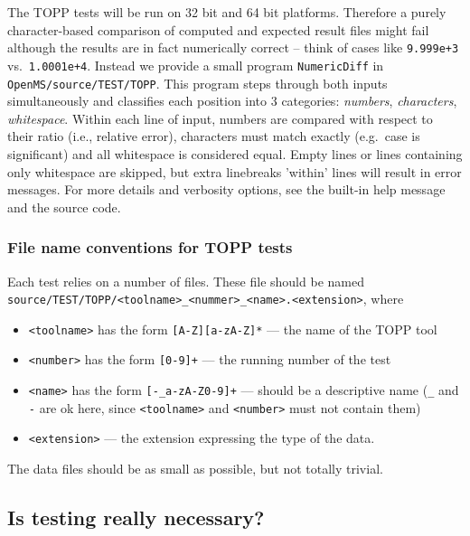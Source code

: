 \documentclass[a4]{article}
\begin{document}
The TOPP tests will be run on 32 bit and 64 bit platforms.  Therefore a purely
character-based comparison of computed and expected result files might fail
although the results are in fact numerically correct -- think of cases like
\texttt{9.999e+3} vs.\ \texttt{1.0001e+4}.  Instead we provide a small program
\texttt{NumericDiff} in \texttt{OpenMS/source/TEST/TOPP}.  This program steps
through both inputs simultaneously and classifies each position into 3
categories: \emph{numbers}, \emph{characters}, \emph{whitespace}.  Within each
line of input, numbers are compared with respect to their ratio (i.e.,
relative error), characters must match exactly (e.g.\ case is significant) and
all whitespace is considered equal.  Empty lines or lines containing only
whitespace are skipped, but extra linebreaks 'within' lines will result in error
messages.  For more details and verbosity options, see the built-in help
message and the source code.

\subsubsection{File name conventions for TOPP tests}

Each test relies on a number of files.  These file should be named \\
\verb|source/TEST/TOPP/<toolname>_<nummer>_<name>.<extension>|, where
\begin{itemize}
 \item \verb|<toolname>| has the form \verb|[A-Z][a-zA-Z]*| --- the name of
  the TOPP tool
 \item \verb|<number>| has the form \verb|[0-9]+| --- the running number of
  the test
 \item \verb|<name>| has the form \verb|[-_a-zA-Z0-9]+| --- should be a
  descriptive name (\verb|_| and \verb|-| are ok here, since \verb|<toolname>|
  and \verb|<number>| must not contain them)
 \item \verb|<extension>| --- the extension expressing the type of the data.
\end{itemize}
The data files should be as small as possible, but not totally trivial.

\subsection{Is testing really necessary?}
\end{document}
